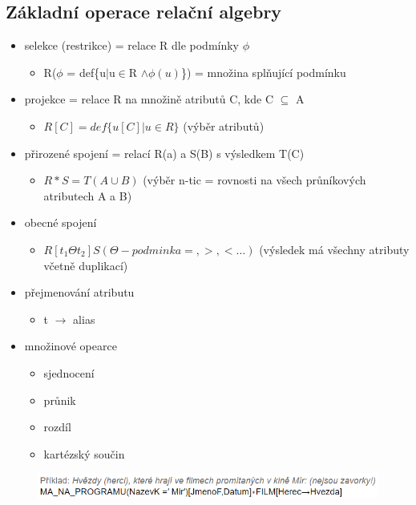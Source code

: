 \documentclass{szzclass}
\begin{document}
\subsection{Základní operace relační algebry}
\begin{itemize}
  \item selekce (restrikce) = relace R dle podmínky $\phi$
  \begin{itemize}
    \item R($\phi$ = def\{u$|$u$\in$R $\wedge \phi (u)$\}) = množina splňující podmínku
  \end{itemize}
  \item projekce = relace R na množině atributů C, kde C $\subseteq$ A
  \begin{itemize}
    \item $R[C] = def \{u[C] | u \in R\}$ (výběr atributů)
  \end{itemize}
  \item přirozené spojení = relací R(a) a S(B) s výsledkem T(C)
  \begin{itemize}
    \item $R*S = T(A \cup B)$ (výběr n-tic = rovnosti na všech průníkových atributech A a B)
  \end{itemize}
  \item obecné spojení
  \begin{itemize}
    \item $R[t_1 \Theta t_2]S (\Theta - podminka =, >, <\dots)$ (výsledek má všechny atributy včetně duplikací)
  \end{itemize}
  \item přejmenování atributu
  \begin{itemize}
    \item t $\rightarrow$ alias
  \end{itemize}
  \item množinové opearce
  \begin{itemize}
    \item sjednocení
    \item průnik
    \item rozdíl
    \item kartézský součin
  \end{itemize}
\end{itemize}

\begin{figure}[h!]
  \centering
  \includegraphics[width = \textwidth ]{topics/bi-spol-09/images/RaExample.png}
\end{figure}
\end{document}
